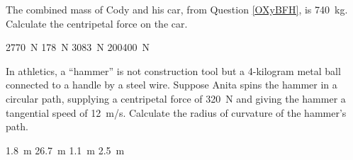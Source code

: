 \documentclass[dvipsnames]{exam}
\begin{document}
\begin{questions}
\clearpage

\question
The combined mass of Cody and his car, from Question \ref{OXyBFH}, is \SI{740}{kg}. Calculate the centripetal force on the car.

\begin{randomizechoices}
    \correctchoice \SI{2770}{N}
    \choice \SI{178}{N}
    \choice \SI{3083}{N}
    \choice \SI{200400}{N}
\end{randomizechoices}

\question \label{N3JMlC}
In athletics, a ``hammer'' is not construction tool but a 4-kilogram metal ball connected to a handle by a steel wire. Suppose Anita spins the hammer in a circular path, supplying a centripetal force of \SI{320}{N} and giving the hammer a tangential speed of \SI{12}{m/s}. Calculate the radius of curvature of the hammer's path.

\begin{minipage}{6cm}
    \centering
    \begin{randomizechoices}
        \correctchoice \SI{1.8}{m}
        \choice \SI{26.7}{m}
        \choice \SI{1.1}{m}
        \choice \SI{2.5}{m}
    \end{randomizechoices}
\end{minipage}%
\begin{minipage}{6cm}
    \centering
\begin{center}
    \end{center}
\end{minipage}


\end{questions}
\end{document}
